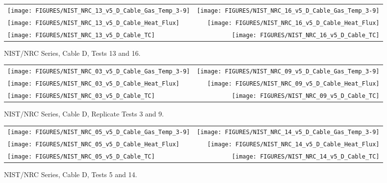\begin{figure}[h]
\begin{tabular*}{\textwidth}{l@{\extracolsep{\fill}}r}
\texttt{[image: FIGURES/NIST\_NRC\_13\_v5\_D\_Cable\_Gas\_Temp\_3-9]} &
\texttt{[image: FIGURES/NIST\_NRC\_16\_v5\_D\_Cable\_Gas\_Temp\_3-9]} \\
\texttt{[image: FIGURES/NIST\_NRC\_13\_v5\_D\_Cable\_Heat\_Flux]} &
\texttt{[image: FIGURES/NIST\_NRC\_16\_v5\_D\_Cable\_Heat\_Flux]} \\
\texttt{[image: FIGURES/NIST\_NRC\_13\_v5\_D\_Cable\_TC]} &
\texttt{[image: FIGURES/NIST\_NRC\_16\_v5\_D\_Cable\_TC]}
\end{tabular*}
\caption{NIST/NRC Series, Cable D, Tests 13 and 16.}
\label{NIST_NRC_D_13_and_16}
\end{figure}

\begin{figure}[h]
\begin{tabular*}{\textwidth}{l@{\extracolsep{\fill}}r}
\texttt{[image: FIGURES/NIST\_NRC\_03\_v5\_D\_Cable\_Gas\_Temp\_3-9]} &
\texttt{[image: FIGURES/NIST\_NRC\_09\_v5\_D\_Cable\_Gas\_Temp\_3-9]} \\
\texttt{[image: FIGURES/NIST\_NRC\_03\_v5\_D\_Cable\_Heat\_Flux]} &
\texttt{[image: FIGURES/NIST\_NRC\_09\_v5\_D\_Cable\_Heat\_Flux]} \\
\texttt{[image: FIGURES/NIST\_NRC\_03\_v5\_D\_Cable\_TC]} &
\texttt{[image: FIGURES/NIST\_NRC\_09\_v5\_D\_Cable\_TC]}
\end{tabular*}
\caption{NIST/NRC Series, Cable D, Replicate Tests 3 and 9.}
\label{NIST_NRC_D_3_and_9}
\end{figure}

\begin{figure}[h]
\begin{tabular*}{\textwidth}{l@{\extracolsep{\fill}}r}
\texttt{[image: FIGURES/NIST\_NRC\_05\_v5\_D\_Cable\_Gas\_Temp\_3-9]} &
\texttt{[image: FIGURES/NIST\_NRC\_14\_v5\_D\_Cable\_Gas\_Temp\_3-9]} \\
\texttt{[image: FIGURES/NIST\_NRC\_05\_v5\_D\_Cable\_Heat\_Flux]} &
\texttt{[image: FIGURES/NIST\_NRC\_14\_v5\_D\_Cable\_Heat\_Flux]} \\
\texttt{[image: FIGURES/NIST\_NRC\_05\_v5\_D\_Cable\_TC]} &
\texttt{[image: FIGURES/NIST\_NRC\_14\_v5\_D\_Cable\_TC]}
\end{tabular*}
\caption{NIST/NRC Series, Cable D, Tests 5 and 14.}
\label{NIST_NRC_D_5_and_14}
\end{figure}

